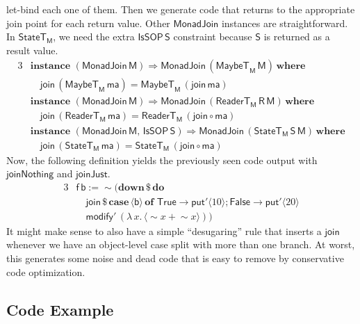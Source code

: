 \documentclass[acmsmall]{acmart}
\newcommand{\mit}[1]{{\mathsf{#1}}}
\newcommand{\msf}[1]{{\mathsf{#1}}}
\newcommand{\mbf}[1]{{\mathbf{#1}}}
\newcommand{\bs}[1]{\boldsymbol{#1}}
\newcommand{\mdo}{\mbf{do}\,}
\newcommand{\ind}{\hspace{1em}}
\newcommand{\where}{\mbf{where}}
\newcommand{\M}{\msf{M}}
\newcommand{\of}{\mbf{of}\,}
\newcommand{\vma}{\mathsf{ma}}
\newcommand{\vS}{\mathsf{S}}
\newcommand{\vR}{\mathsf{R}}
\newcommand{\vM}{\mathsf{M}}
\newcommand{\vb}{\mathsf{b}}
\newcommand{\vf}{\mathsf{f}}
\newcommand{\IsSOP}{\msf{IsSOP}}
\newcommand{\ReaderT}{\msf{ReaderT}}
\newcommand{\case}{\mbf{case\,}}
\newcommand{\spl}{{\bs{\sim}}}
\newcommand{\ql}{{\bs{\langle}}}
\newcommand{\qr}{{\bs{\rangle}}}
\newcommand{\True}{\msf{True}}
\newcommand{\False}{\msf{False}}
\newcommand{\MaybeT}{\msf{MaybeT}}
\theoremstyle{remark}
\newcommand{\mdown}{\mbf{down}}
\newcommand{\instance}{\mbf{instance}\,}
\newcommand{\qt}[1]{\ql#1\qr}
\newcommand{\RA}{\Rightarrow}
\newcommand{\StateT}{\msf{StateT}}
\newcommand{\dlr}{\,\$\,}
\newcommand{\MonadJoin}{\msf{MonadJoin}}
\newcommand{\join}{\mit{join}}
\newcommand{\modify}{\mit{modify}}
\newcommand{\mput}{\mit{put}}
\begin{document}
let-bind each one of them. Then we generate code that returns to the appropriate
join point for each return value. Other $\MonadJoin$ instances are straightforward. In
$\StateT_\M$, we need the extra $\IsSOP\,\vS$ constraint because $\vS$ is returned
as a result value.
\begin{alignat*}{3}
  & \instance\,(\MonadJoin\,\vM) \RA \MonadJoin\,(\MaybeT_\M\,\vM)\,\where\\
  & \ind \join\,(\MaybeT_\M\,\vma) = \MaybeT_\M\,(\join\,\vma)\\
  & \instance\,(\MonadJoin\,\vM) \RA \MonadJoin\,(\ReaderT_\M\,\vR\,\vM)\,\where\\
  & \ind \join\,(\ReaderT_\M\,\vma) = \ReaderT_\M\,(\join \circ \vma)\\
  & \instance\,(\MonadJoin\,\vM,\,\IsSOP\,\vS) \RA \MonadJoin\,(\StateT_\M\,\vS\,\vM)\,\where\\
  & \ind \join\,(\StateT_\M\,\vma) = \StateT_\M\,(\join \circ \vma)
\end{alignat*}
Now, the following definition yields the previously seen code output with
$\msf{joinNothing}$ and $\msf{joinJust}$.
\begin{alignat*}{3}
  & \vf\,\vb := \spl(\mdown \dlr \mdo \\
  & \ind \join \dlr \case \qt{\vb}\,\of\,\True\to \mput' \qt{10}; \False \to \mput' \qt{20}\\
  & \ind\modify'\,(\lambda\,x.\,\qt{\spl x + \spl x}))
\end{alignat*}
It might make sense to also have a simple ``desugaring'' rule that inserts a
$\join$ whenever we have an object-level case split with more than one branch. At
worst, this generates some noise and dead code that is easy to remove by
conservative code optimization.

\subsection{Code Example}
\end{document}

